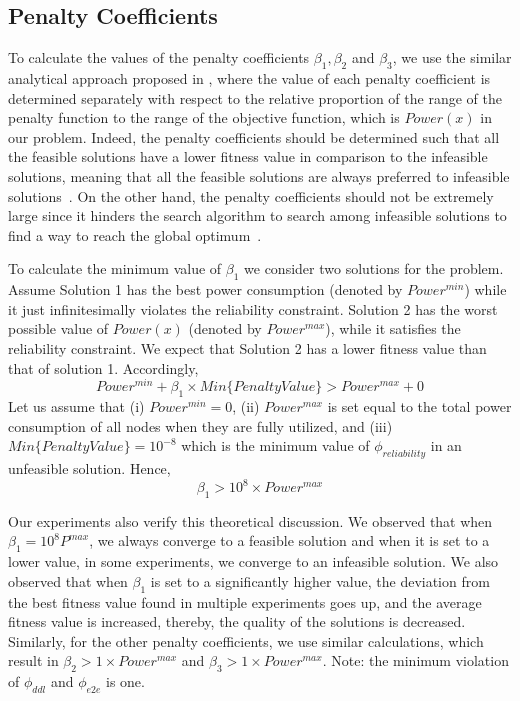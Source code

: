 \subsection{Penalty Coefficients}
\label{sec:penaltycoefficient}
To calculate the values of the penalty coefficients $\beta_1,\beta_2$ and $\beta_3$, we use the similar analytical approach proposed in \cite{Faragardi2018AnSystems},
where the value of each penalty coefficient is determined separately with respect to the relative proportion of the range of the penalty function to the range of the objective function, which is $Power(x)$ in our problem. Indeed, the penalty coefficients should be determined such that all the feasible solutions have a lower fitness value in comparison to the infeasible solutions, meaning that all the feasible solutions are always preferred to infeasible solutions~\cite{faragardi2018AECUs}. On the other hand, the penalty coefficients should not be extremely large since it hinders the search algorithm to search among infeasible solutions to find a way to reach the global optimum~\cite{Talbi2009Metaheuristics:Implementation}.

To calculate the minimum value of $\beta_1$ we consider two solutions for the problem. Assume Solution 1 has the best power consumption (denoted by $Power^{min}$) while it just infinitesimally violates the reliability constraint. Solution 2 has the worst possible value of $Power(x)$ (denoted by $Power^{max}$), while it satisfies the reliability constraint. We expect that Solution 2 has a lower fitness value than that of solution 1. Accordingly,
\begin{equation*}
\label{eqn_PnelatyMem1}
Power^{min} + \beta_1 \times Min\{Penalty Value\} > Power^{max} + 0
\end{equation*}  
Let us assume that (i) $Power^{min} = 0$, (ii) $Power^{max}$ is set equal to the total power consumption of all nodes when they are fully utilized, and (iii) $Min\{Penalty Value\} = 10^{-8}$ which is the minimum value of $\phi_{reliability}$ in an unfeasible solution. Hence,
\begin{equation*}
\label{eqn_PnelatyMem2}
\beta_1 > 10^8 \times Power^{max}
\end{equation*}  

Our experiments also verify this theoretical discussion. We observed that when $\beta_1 = 10^8P^{max}$, we always converge to a feasible solution and when it is set to a lower value, in some experiments, we converge to an infeasible solution. We also observed that when $\beta_1$ is set to a significantly higher value, the deviation from the best fitness value found in multiple experiments goes up, and the average fitness value is increased, thereby, the quality of the solutions is decreased. Similarly, for the other penalty coefficients, we use similar calculations, which result in $\beta_2 > 1 \times Power^{max}$ and
$\beta_3 > 1 \times Power^{max}$. Note: the minimum violation of $\phi_{ddl}$ and $\phi_{e2e}$ is one.

